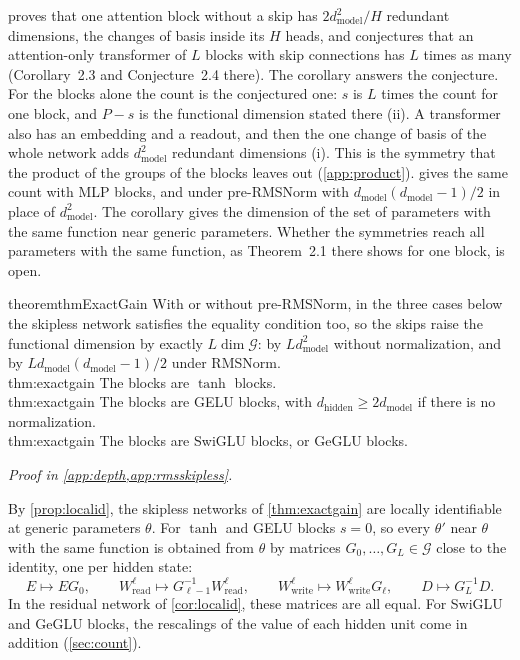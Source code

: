 \documentclass[10pt]{article}
\theoremstyle{definition}
\theoremstyle{remark}
\newcommand{\Wread}{W_{\mathrm{read}}}
\newcommand{\Wwrite}{W_{\mathrm{write}}}
\newcommand{\dm}{d_{\mathrm{model}}}
\newcommand{\dhid}{d_{\mathrm{hidden}}}
\newcommand{\G}{\mathcal{G}}
\newcommand{\ptlabel}[1]{\phantomsection\label{#1}}
\newcommand{\proofin}[1]{\par\vspace{-0.4\baselineskip}\noindent\hfill{\small\itshape Proof in \cref{#1}.}\par\smallskip}
\newcommand{\stpart}[3]{\ifx\relax#1\relax\else\ptlabel{#1:#2}\fi{\upshape\bfseries\boldmath(#2)\ifx\relax#3\relax\else\ #3.\fi}}
\begin{document}
\citet{henry2026generic} proves that one attention block without a skip has $2\dm^2/H$ redundant dimensions, the changes of basis inside its $H$ heads, and conjectures that an attention-only transformer of $L$ blocks with skip connections has $L$ times as many (Corollary~2.3 and Conjecture~2.4 there). The corollary answers the conjecture. For the blocks alone the count is the conjectured one: $s$ is $L$ times the count for one block, and $P - s$ is the functional dimension stated there (ii). A transformer also has an embedding and a readout, and then the one change of basis of the whole network adds $\dm^2$ redundant dimensions (i). This is the symmetry that the product of the groups of the blocks leaves out (\cref{app:product}).  gives the same count with MLP blocks, and under pre-RMSNorm with $\dm(\dm-1)/2$ in place of $\dm^2$. The corollary gives the dimension of the set of parameters with the same function near generic parameters. Whether the symmetries reach all parameters with the same function, as Theorem~2.1 there shows for one block, is open.

\begin{restatable}{theorem}{thmExactGain}\label{thm:exactgain}
With or without pre-RMSNorm, in the three cases below the skipless network satisfies the equality condition too, so the skips raise the functional dimension by exactly $L\dim\G$: by $L\dm^2$ without normalization, and by $L\dm(\dm-1)/2$ under RMSNorm.\\
\stpart{thm:exactgain}{i}{} The blocks are $\tanh$ blocks.\\
\stpart{thm:exactgain}{ii}{} The blocks are GELU blocks, with $\dhid \ge 2\dm$ if there is no normalization.\\
\stpart{thm:exactgain}{iii}{} The blocks are SwiGLU blocks, or GeGLU blocks.
\end{restatable}
\proofin{app:depth,app:rmsskipless}

By \cref{prop:localid}, the skipless networks of \cref{thm:exactgain} are locally identifiable at generic parameters $\theta$. For $\tanh$ and GELU blocks $s = 0$, so every $\theta'$ near $\theta$ with the same function is obtained from $\theta$ by matrices $G_0, \dots, G_L \in \G$ close to the identity, one per hidden state:
\[
E \mapsto EG_0, \qquad \Wread^{\ell} \mapsto G_{\ell-1}^{-1}\Wread^{\ell}, \qquad \Wwrite^{\ell} \mapsto \Wwrite^{\ell}G_\ell, \qquad D \mapsto G_L^{-1}D.
\]
In the residual network of \cref{cor:localid}, these matrices are all equal. For SwiGLU and GeGLU blocks, the rescalings of the value of each hidden unit come in addition (\cref{sec:count}).
\end{document}
